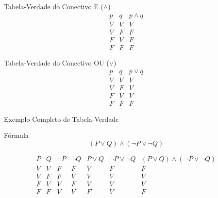 \documentclass[9pt]{beamer}
\begin{document}
\begin{frame}{Tabela-Verdade do Conectivo E ($\land$)}
\LARGE
\[
\begin{array}{c|c|c}
    
p & q & p \land q \\ \hline
V & V & V \\
V & F & F \\
F & V & F \\
F & F & F
\end{array}
\]

\end{frame}
\begin{frame}{Tabela-Verdade do Conectivo OU ($\lor$)}
\LARGE
\[
\begin{array}{c|c|c}
p & q & p \lor q \\ \hline
V & V & V \\
V & F & V \\
F & V & V \\
F & F & F
\end{array}
\]

\end{frame}
\begin{frame}{Exemplo Completo de Tabela-Verdade}
\LARGE
\begin{block}{Fórmula}
\[
(P \lor Q) \land (\neg P \lor \neg Q)
\]
\end{block}

\[
\begin{array}{c|c|c|c|c|c|c}
P & Q & \neg P & \neg Q & P \lor Q & \neg P \lor \neg Q & (P \lor Q) \land (\neg P \lor \neg Q) \\ \hline
V & V & F & F & V & F & F \\
V & F & F & V & V & V & V \\
F & V & V & F & V & V & V \\
F & F & V & V & F & V & F
\end{array}
\]

\end{frame}
\end{document}
